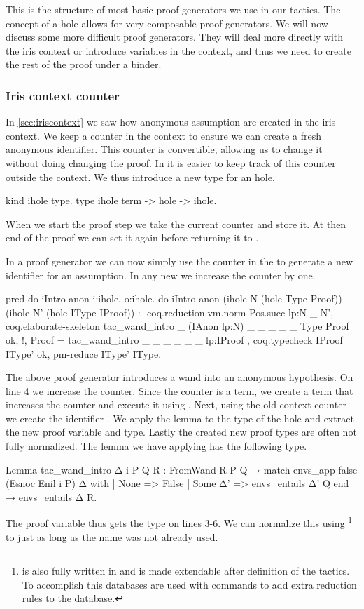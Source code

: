 \documentclass[thesis.tex]{subfiles}
\begin{document}
{{{{This is the structure of most basic proof generators we use in our tactics. The concept of a hole allows for very composable proof generators. We will now discuss some more difficult proof generators. They will deal more directly with the iris context or introduce variables in the \coq context, and thus we need to create the rest of the proof under a binder.

\subsubsection{Iris context counter}\label{ssec:cecontextcounter}
In \cref{sec:iriscontext} we saw how anonymous assumption are created in the iris context. We keep a counter in the context to ensure we can create a fresh anonymous identifier. This counter is convertible, allowing us to change it without doing changing the proof. In \elpi it is easier to keep track of this counter outside the context. We thus introduce a new type for an \iris hole.
\begin{elpicode}
  kind ihole type.
  type ihole term -> hole -> ihole. %
\end{elpicode}
When we start the proof step we take the current counter and store it. At then end of the proof we can set it again before returning it to \coq.

In a proof generator we can now simply use the counter in the  to generate a new identifier for an assumption. In any new  we increase the counter by one.
\begin{elpicode}
  pred do-iIntro-anon i:ihole, o:ihole.
  do-iIntro-anon (ihole N (hole Type Proof)) 
                 (ihole N' (hole IType IProof)) :-
    coq.reduction.vm.norm {{ Pos.succ lp:N }} _ N',
    coq.elaborate-skeleton 
      {{ tac_wand_intro _ (IAnon lp:N) _ _ _ _ _ }} 
      Type Proof ok, !,
    Proof = {{ tac_wand_intro _ _ _ _ _ _ lp:IProof }}, 
    coq.typecheck IProof IType' ok,
    pm-reduce IType' IType.
\end{elpicode}
The above proof generator introduces a wand into an anonymous hypothesis. On line 4 we increase the counter. Since the counter is a \coq term, we create a \coq term that increases the counter and execute it using . Next, using the old context counter we create the identifier . We apply the lemma to the type of the hole and extract the new proof variable and type. Lastly the created new proof types are often not fully normalized. The lemma we have applying has the following type.
\begin{coqcode}
  Lemma tac_wand_intro Δ i P Q R :
    FromWand R P Q →
    match envs_app false (Esnoc Enil i P) Δ with
    | None => False
    | Some Δ' => envs_entails Δ' Q
    end →
    envs_entails Δ R.
\end{coqcode}
The proof variable thus gets the type on lines 3-6. We can normalize this using \footnote{ is also fully written in \elpi and is made extendable after definition of the tactics. To accomplish this \ce databases are used with commands to add extra reduction rules to the database.} to just  as long as the name was not already used.


}}}}
\end{document}
